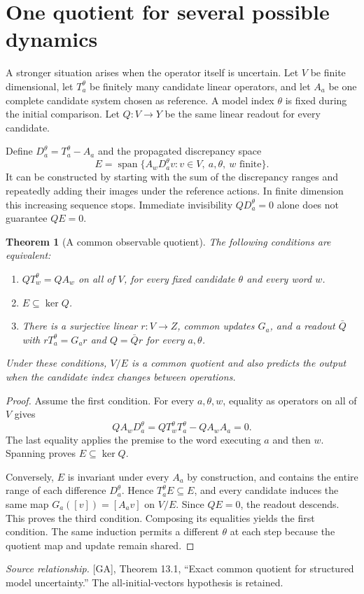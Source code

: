 \documentclass[11pt,oneside,openany]{book}
\newtheorem{theorem}{Theorem}[chapter]
\theoremstyle{definition}\newtheorem{definition}[theorem]{Definition}
\newcommand{\Span}{\operatorname{span}}
\newcommand{\source}[1]{\par{\small\textit{Source relationship.} #1}\par}
\begin{document}
\section{One quotient for several possible dynamics}
A stronger situation arises when the operator itself is uncertain. Let $V$ be finite dimensional, let $T_a^\theta$ be finitely many candidate linear operators, and let $A_a$ be one complete candidate system chosen as reference. A model index $\theta$ is fixed during the initial comparison. Let $Q:V\to Y$ be the same linear readout for every candidate.

Define $D_a^\theta=T_a^\theta-A_a$ and the propagated discrepancy space
\[
E=\Span\{A_wD_a^\theta v: v\in V,\ a,\theta,\ w\text{ finite}\}.
\]
It can be constructed by starting with the sum of the discrepancy ranges and repeatedly adding their images under the reference actions. In finite dimension this increasing sequence stops. Immediate invisibility $QD_a^\theta=0$ alone does not guarantee $QE=0$.

\begin{theorem}[A common observable quotient]\label{r:common}
The following conditions are equivalent:
\begin{enumerate}
\item $QT_w^\theta=QA_w$ on all of $V$, for every fixed candidate $\theta$ and every word $w$.
\item $E\subseteq\ker Q$.
\item There is a surjective linear $r:V\to Z$, common updates $G_a$, and a readout $\bar Q$ with $rT_a^\theta=G_ar$ and $Q=\bar Qr$ for every $a,\theta$.
\end{enumerate}
Under these conditions, $V/E$ is a common quotient and also predicts the output when the candidate index changes between operations.
\end{theorem}
\begin{proof}
Assume the first condition. For every $a,\theta,w$, equality as operators on all of $V$ gives
\[
QA_wD_a^\theta=QT_w^\theta T_a^\theta-QA_wA_a=0.
\]
The last equality applies the premise to the word executing $a$ and then $w$. Spanning proves $E\subseteq\ker Q$.

Conversely, $E$ is invariant under every $A_a$ by construction, and contains the entire range of each difference $D_a^\theta$. Hence $T_a^\theta E\subseteq E$, and every candidate induces the same map $G_a([v])=[A_av]$ on $V/E$. Since $QE=0$, the readout descends. This proves the third condition. Composing its equalities yields the first condition. The same induction permits a different $\theta$ at each step because the quotient map and update remain shared.
\end{proof}
\source{[GA], Theorem 13.1, ``Exact common quotient for structured model uncertainty.'' The all-initial-vectors hypothesis is retained.}
\end{document}
